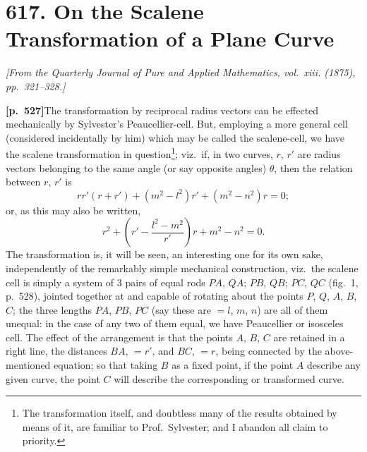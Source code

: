 \documentclass[11pt,a4paper]{article}
\begin{document}
\newpage

\section*{\textbf{617.} On the Scalene Transformation of a Plane Curve}

\textit{[From the Quarterly Journal of Pure and Applied Mathematics, vol.~xiii. (1875), pp.~321--328.]}

\bigskip

\noindent\textbf{[p.~527]}\quad The transformation by reciprocal radius vectors can be effected mechanically by Sylvester's Peaucellier-cell. But, employing a more general cell (considered incidentally by him) which may be called the scalene-cell, we have the scalene transformation in question\footnote{The transformation itself, and doubtless many of the results obtained by means of it, are familiar to Prof.~Sylvester; and I abandon all claim to priority.}; viz.\ if, in two curves, $r$, $r'$ are radius vectors belonging to the same angle (or say opposite angles) $\theta$, then the relation between $r$, $r'$ is
\[
rr'(r + r') + (m^{2} - l^{2})r' + (m^{2} - n^{2})r = 0;
\]
or, as this may also be written,
\[
r^{2} + \left(r' - \frac{l^{2} - m^{2}}{r'}\right)r + m^{2} - n^{2} = 0.
\]
The transformation is, it will be seen, an interesting one for its own sake, independently of the remarkably simple mechanical construction, viz.\ the scalene cell is simply a system of 3 pairs of equal rods $PA$, $QA$; $PB$, $QB$; $PC$, $QC$ (fig.~1, p.~528), jointed together at and capable of rotating about the points $P$, $Q$, $A$, $B$, $C$; the three lengths $PA$, $PB$, $PC$ (say these are $= l$, $m$, $n$) are all of them unequal: in the case of any two of them equal, we have Peaucellier or isosceles cell. The effect of the arrangement is that the points $A$, $B$, $C$ are retained in a right line, the distances $BA$, $= r'$, and $BC$, $= r$, being connected by the above-mentioned equation; so that taking $B$ as a fixed point, if the point $A$ describe any given curve, the point $C$ will describe the corresponding or transformed curve.
\end{document}
